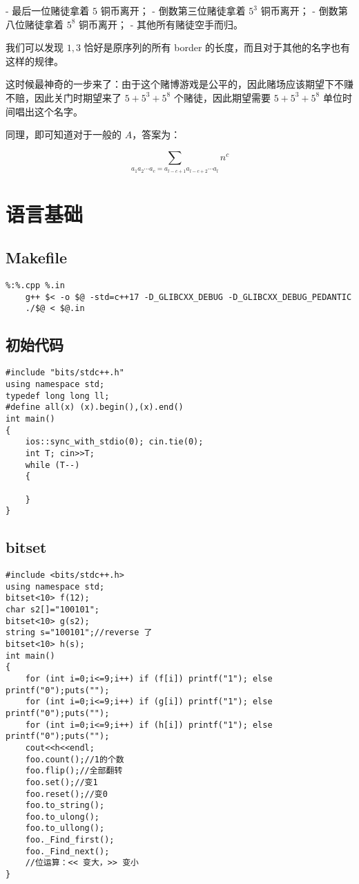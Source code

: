 \documentclass[12pt]{ctexart}
\begin{document}
- 最后一位赌徒拿着 $5$ 铜币离开；
- 倒数第三位赌徒拿着 $5^3$ 铜币离开；
- 倒数第八位赌徒拿着 $5^8$ 铜币离开；
- 其他所有赌徒空手而归。

我们可以发现 $1,3$ 恰好是原序列的所有 border 的长度，而且对于其他的名字也有这样的规律。

这时候最神奇的一步来了：由于这个赌博游戏是公平的，因此赌场应该期望下不赚不赔，因此关门时期望来了 $5+5^3+5^8$ 个赌徒，因此期望需要 $5+5^3+5^8$ 单位时间唱出这个名字。

同理，即可知道对于一般的 $A$，答案为：

$$\sum\limits_{a_1a_2\cdots a_c=a_{l-c+1}a_{l-c+2}\cdots a_l} n^c$$


\newpage

\section{语言基础}

\subsection{Makefile}

\begin{lstlisting}
%:%.cpp %.in
	g++ $< -o $@ -std=c++17 -D_GLIBCXX_DEBUG -D_GLIBCXX_DEBUG_PEDANTIC
	./$@ < $@.in
\end{lstlisting}
\subsection{初始代码}

\begin{lstlisting}
#include "bits/stdc++.h"
using namespace std;
typedef long long ll;
#define all(x) (x).begin(),(x).end()
int main()
{
	ios::sync_with_stdio(0); cin.tie(0);
	int T; cin>>T;
	while (T--)
	{

	}
}
\end{lstlisting}


\subsection{bitset}

\begin{lstlisting}
#include <bits/stdc++.h>
using namespace std;
bitset<10> f(12);
char s2[]="100101";
bitset<10> g(s2);
string s="100101";//reverse 了
bitset<10> h(s);
int main()
{
	for (int i=0;i<=9;i++) if (f[i]) printf("1"); else printf("0");puts("");
	for (int i=0;i<=9;i++) if (g[i]) printf("1"); else printf("0");puts("");
	for (int i=0;i<=9;i++) if (h[i]) printf("1"); else printf("0");puts("");
	cout<<h<<endl;
    foo.count();//1的个数
	foo.flip();//全部翻转
	foo.set();//变1
	foo.reset();//变0
	foo.to_string();
	foo.to_ulong();
	foo.to_ullong();
	foo._Find_first();
	foo._Find_next();
    //位运算：<< 变大，>> 变小
}
\end{lstlisting}
\end{document}
